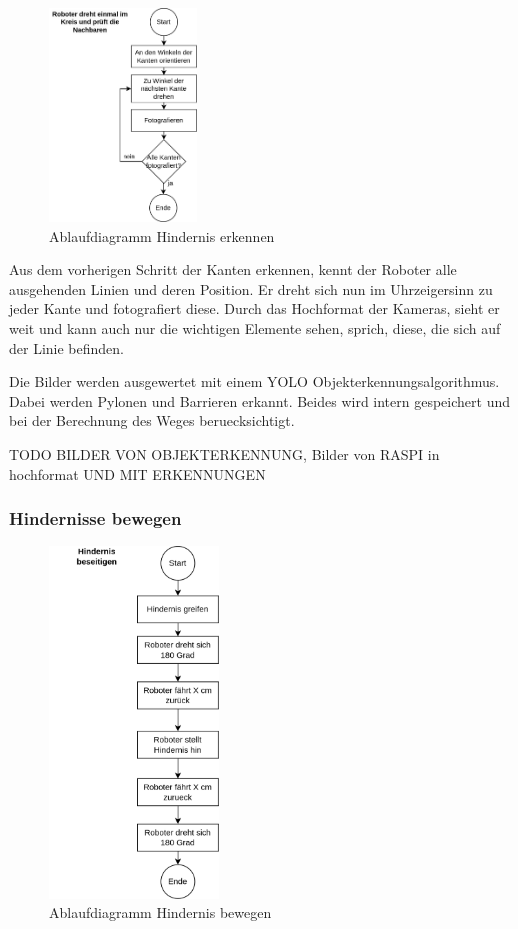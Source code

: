 \begin{figure}[H]
\centering
\includegraphics[width=0.35\textwidth]{assets/gesamtkonzept/ablaufdiagramm-hindernisse-erkennen.png}
\caption{Ablaufdiagramm Hindernis erkennen}
\label{fig:ablaufdiagramm-hindernis-erkennen}
\end{figure}

Aus dem vorherigen Schritt der Kanten erkennen, kennt der Roboter alle ausgehenden Linien und deren Position. Er dreht sich nun im Uhrzeigersinn zu jeder Kante und fotografiert diese. Durch das Hochformat der Kameras, sieht er weit und kann auch nur die wichtigen Elemente sehen, sprich, diese, die sich auf der Linie befinden.

Die Bilder werden ausgewertet mit einem YOLO Objekterkennungsalgorithmus. Dabei werden Pylonen und Barrieren erkannt. Beides wird intern gespeichert und bei der Berechnung des Weges beruecksichtigt.

TODO BILDER VON OBJEKTERKENNUNG, Bilder von RASPI in hochformat UND MIT ERKENNUNGEN



\subsubsection{Hindernisse bewegen}

\begin{figure}[H]
\centering
\includegraphics[width=0.4\textwidth]{assets/gesamtkonzept/ablaufdiagramm-hindernis-bewegen.png}
\caption{Ablaufdiagramm Hindernis bewegen}
\label{fig:ablaufdiagramm-hindernis-bewegen}
\end{figure}

